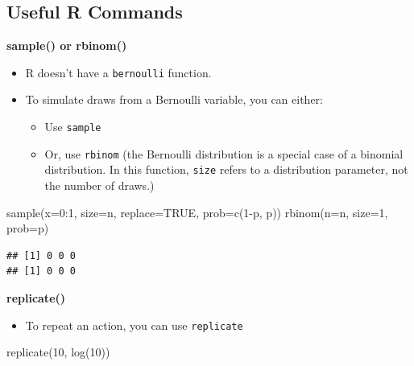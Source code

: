 \documentclass[
]{book}
\newenvironment{Shaded}{\begin{snugshade}}{\end{snugshade}}
\newcommand{\AttributeTok}[1]{\textcolor[rgb]{0.77,0.63,0.00}{#1}}
\newcommand{\ConstantTok}[1]{\textcolor[rgb]{0.00,0.00,0.00}{#1}}
\newcommand{\DecValTok}[1]{\textcolor[rgb]{0.00,0.00,0.81}{#1}}
\newcommand{\FunctionTok}[1]{\textcolor[rgb]{0.00,0.00,0.00}{#1}}
\newcommand{\NormalTok}[1]{#1}
\newcommand{\SpecialCharTok}[1]{\textcolor[rgb]{0.00,0.00,0.00}{#1}}
\providecommand{\tightlist}{%
  \setlength{\itemsep}{0pt}\setlength{\parskip}{0pt}}
\theoremstyle{definition}
\theoremstyle{definition}
\theoremstyle{definition}
\theoremstyle{definition}
\theoremstyle{remark}
\begin{document}
\hypertarget{useful-r-commands}{%
\subsection{Useful R Commands}\label{useful-r-commands}}

\textbf{sample() or rbinom()}

\begin{itemize}
\tightlist
\item
  R doesn't have a \texttt{bernoulli} function.
\item
  To simulate draws from a Bernoulli variable, you can either:

  \begin{itemize}
  \tightlist
  \item
    Use \texttt{sample}
  \item
    Or, use \texttt{rbinom} (the Bernoulli distribution is a special case of a binomial distribution. In this function, \texttt{size} refers to a distribution parameter, not the number of draws.)
  \end{itemize}
\end{itemize}

\begin{Shaded}
\begin{Highlighting}[]
\FunctionTok{sample}\NormalTok{(}\AttributeTok{x=}\DecValTok{0}\SpecialCharTok{:}\DecValTok{1}\NormalTok{, }\AttributeTok{size=}\NormalTok{n, }\AttributeTok{replace=}\ConstantTok{TRUE}\NormalTok{, }\AttributeTok{prob=}\FunctionTok{c}\NormalTok{(}\DecValTok{1}\SpecialCharTok{{-}}\NormalTok{p, p))}
\FunctionTok{rbinom}\NormalTok{(}\AttributeTok{n=}\NormalTok{n, }\AttributeTok{size=}\DecValTok{1}\NormalTok{, }\AttributeTok{prob=}\NormalTok{p)}
\end{Highlighting}
\end{Shaded}

\begin{verbatim}
## [1] 0 0 0
## [1] 0 0 0
\end{verbatim}

\textbf{replicate()}

\begin{itemize}
\tightlist
\item
  To repeat an action, you can use \texttt{replicate}
\end{itemize}

\begin{Shaded}
\begin{Highlighting}[]
\FunctionTok{replicate}\NormalTok{(}\DecValTok{10}\NormalTok{, }\FunctionTok{log}\NormalTok{(}\DecValTok{10}\NormalTok{))}
\end{Highlighting}
\end{Shaded}
\end{document}

